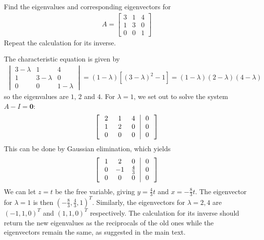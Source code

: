 \begin{Exercise}
Find the eigenvalues and corresponding eigenvectors for
\begin{align*}
A =
\begin{bmatrix}
3 & 1 & 4\\
1 & 3 & 0\\
0 & 0 & 1
\end{bmatrix}
\end{align*}
Repeat the calculation for its inverse.
\end{Exercise}
\begin{Answer}
The characteristic equation is given by
\begin{align*}
\begin{vmatrix}
3 - \lambda & 1 & 4\\
1 & 3 - \lambda & 0\\
0 & 0 & 1 - \lambda
\end{vmatrix} 
= (1 - \lambda) [(3-\lambda)^2-1] = (1 - \lambda)(2 - \lambda)(4 - \lambda)
\end{align*}
so the eigenvalues are $1$, $2$ and $4$. For $\lambda = 1$, we set out to solve the system $A-I = \textbf{0}$:
\begin{align*}
\left[
\begin{array}{wc{10pt}wc{10pt}wc{10pt}|wc{10pt}}
2 & 1 & 4 & 0\\
1 & 2 & 0 & 0\\
0 & 0 & 0 & 0
\end{array}
\right]    
\end{align*}
This can be done by Gaussian elimination, which yields
\begin{align*}
\left[\begin{array}{wc{10pt}wc{10pt}wc{10pt}|wc{10pt}}
1 & 2 & 0 & 0\\
0 & -1 & \frac{4}{3} & 0 \\
0 & 0 & 0 & 0
\end{array}\right]
\end{align*}
We can let $z = t$ be the free variable, giving $y = \frac{4}{3}t$ and $x = -\frac{8}{3}t$. The eigenvector for $\lambda = 1$ is then $(-\frac{8}{3}, \frac{4}{3}, 1)^T$. Similarly, the eigenvectors for $\lambda = 2,4$ are $(-1,1,0)^T$ and $(1,1,0)^T$ respectively. The calculation for its inverse should return the new eigenvalues as the reciprocals of the old ones while the eigenvectors remain the same, as suggested in the main text.
\end{Answer}

